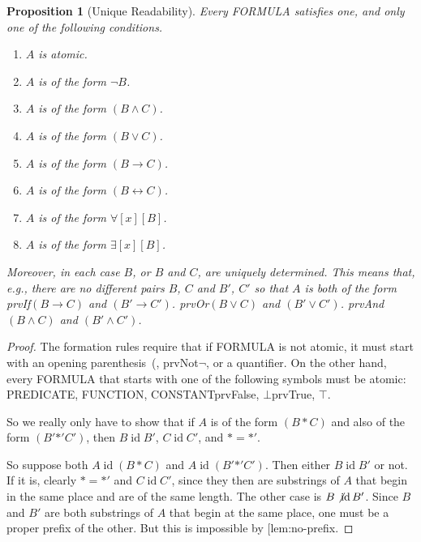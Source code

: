 \documentclass[10pt,a4paper]{article}
\makeatletter
\newcommand*{\olup}[1]{\MakeUppercase{#1}}
\theoremstyle{plain}
\newtheorem{prop}[thm]{Proposition}
\theoremstyle{definition}
\theoremstyle{remark}
\newcommand{\olref}{\@ifnextchar[{\olref@i}{\olref@final}}
\def\olref@i[#1]{\@ifnextchar[{\olref@ii}{\olref@final}}
\def\olref@ii[#1]{\@ifnextchar[{\olref@iii}{\olref@final}}
\def\olref@iii[#1]{\olref@final}
\def\olref@final#1{\ref{#1}}
\providecommand{\lif}{\mathbin{\rightarrow}}
\providecommand{\lforall}{\mathord{\forall}}
\providecommand{\lexists}{\mathord{\exists}}
\providecommand{\ltrue}{\top}
\providecommand{\lfalse}{\bot}
\providecommand{\iftag}[1]{#1}
\providecommand{\tagitem}[1]{\item[#1]}
\providecommand{\liff}{\mathbin{\leftrightarrow}}
\providecommand{\ident}{\operatorname{id}}
\providecommand{\iftag}{}
\makeatother
\begin{document}
\begin{prop}[Unique Readability]
Every \olup{formula} satisfies one, and only one of the following conditions.
\begin{enumerate}
\item $A$ is atomic.

\tagitem{prvNot}{$A$ is of the form $\lnot B$.}{}

\tagitem{prvAnd}{$A$ is of the form $(B \land C)$.}{}

\tagitem{prvOr}{$A$ is of the form $(B \lor C)$.}{}

\tagitem{prvIf}{$A$ is of the form $(B \lif C)$.}{}

\tagitem{prvIff}{$A$ is of the form $(B \liff C)$.}{}

\tagitem{prvAll}{$A$ is of the form $\lforall[x][B]$.}{}

\tagitem{prvEx}{$A$ is of the form $\lexists[x][B]$.}{}
\end{enumerate}
Moreover, in each case $B$, or $B$ and $C$, are uniquely
determined.  This means that, e.g., there are no different pairs $B$,
$C$ and $B'$, $C'$ so that $A$ is both of the form 
\iftag{prvIf}{$(B \lif C)$ and $(B' \lif C')$.}{
    \iftag{prvOr}{$(B \lor C)$ and $(B' \lor C')$.}{
      \iftag{prvAnd}{$(B \land C)$ and $(B' \land C')$.}{}}}
\end{prop}

\begin{proof}
The formation rules require that if \olup{formula} is not atomic, it
must start with an opening parenthesis~(, \iftag{prvNot}{$\lnot$,}{}
or a quantifier. On the other hand, every \olup{formula} that starts with
one of the following symbols must be atomic: \olup{predicate}, \olup{function}, \olup{constant}\iftag{prvFalse}{, $\lfalse$}{}\iftag{prvTrue}{, $\ltrue$}{}.

So we really only have to show that if $A$ is of the form $(B \ast
C)$ and also of the form $(B' \mathbin{\ast'} C')$, then $B \ident
B'$, $C \ident C'$, and $\ast = {\ast'}$.

So suppose both $A \ident (B \ast C)$ and $A \ident (B'
\mathbin{\ast'} C')$.  Then either $B \ident B'$ or not.  If it is,
clearly $\ast = {\ast'}$ and $C \ident C'$, since they then are
substrings of $A$ that begin in the same place and are of the same
length.  The other case is $B \not\ident B'$.  Since $B$ and
$B'$ are both substrings of $A$ that begin at the same place, one
must be a proper prefix of the other.  But this is impossible by
\olref{lem:no-prefix}.
\end{proof}
\end{document}
